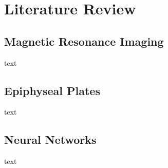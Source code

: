 \section{Literature Review}

\subsection{Magnetic Resonance Imaging}

text

\subsection{Epiphyseal Plates}

text

\subsection{Neural Networks}

text

\newpage